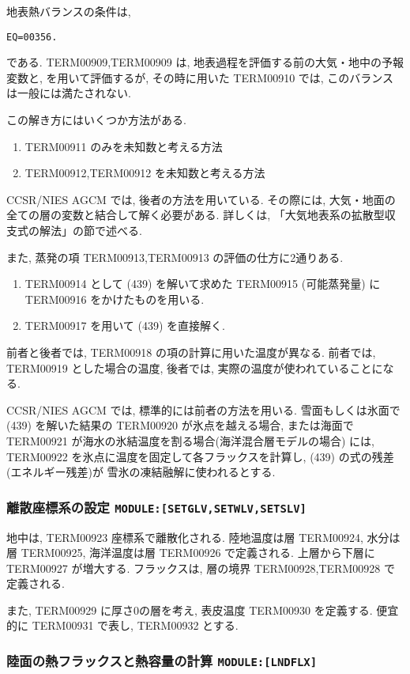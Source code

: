 地表熱バランスの条件は,
%
\begin{verbatim}
EQ=00356.
\end{verbatim}
%
である.
TERM00909,TERM00909 は,
地表過程を評価する前の大気・地中の予報変数と,
を用いて評価するが, 
その時に用いた TERM00910 では, このバランスは一般には満たされない.

この解き方にはいくつか方法がある.
\begin{enumerate}
\item TERM00911 のみを未知数と考える方法
\item TERM00912,TERM00912 を未知数と考える方法
\end{enumerate}
CCSR/NIES AGCM では, 後者の方法を用いている.
その際には, 大気・地面の全ての層の変数と結合して解く必要がある.
詳しくは, 「大気地表系の拡散型収支式の解法」の節で述べる.

また, 蒸発の項 TERM00913,TERM00913 の評価の仕方に2通りある.
\begin{enumerate}
\item TERM00914 として
      (439) を解いて求めた TERM00915 
      (可能蒸発量) に  TERM00916 をかけたものを用いる.

\item TERM00917 を用いて
      (439) を直接解く.
\end{enumerate}
前者と後者では, TERM00918 の項の計算に用いた温度が異なる.
前者では, TERM00919 とした場合の温度,
後者では, 実際の温度が使われていることになる.

CCSR/NIES AGCM では, 標準的には前者の方法を用いる.
雪面もしくは氷面で (439) を解いた結果の
TERM00920 が氷点を越える場合, 
または海面で TERM00921 が海水の氷結温度を割る場合(海洋混合層モデルの場合)
には, TERM00922 を氷点に温度を固定して各フラックスを計算し,
(439) の式の残差(エネルギー残差)が
雪氷の凍結融解に使われるとする.

\subsubsection{離散座標系の設定 \texttt{MODULE:[SETGLV,SETWLV,SETSLV]}}

地中は, TERM00923 座標系で離散化される.
陸地温度は層 TERM00924, 水分は層 TERM00925, 
海洋温度は層 TERM00926 で定義される.
上層から下層に TERM00927 が増大する.
フラックスは, 層の境界 TERM00928,TERM00928 で定義される.

また, TERM00929 に厚さ0の層を考え,
表皮温度 TERM00930 を定義する.
便宜的に TERM00931 で表し, TERM00932 とする.

\subsubsection{陸面の熱フラックスと熱容量の計算 \texttt{MODULE:[LNDFLX]}}

